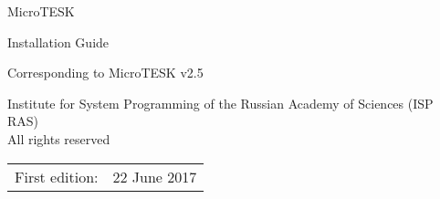 \documentclass[12pt,letterpaper,extrafontsizes]{memoir}
\begin{document}
\firmlists
\midsloppy
\raggedbottom
{}


\frontmatter
\pagestyle{empty}

\vspace*{\fill}
\begin{center}
\HUGE\textsf{MicroTESK}\par
\end{center}

\begin{center}
\Huge\textsf{Installation Guide}\par
\end{center}

\begin{center}
\normalsize\textsf{Corresponding to MicroTESK v2.5}\par
\end{center}

\vspace*{\fill}
\clearpage

\begingroup
\footnotesize
\setlength{\parindent}{0pt}
\setlength{\parskip}{\baselineskip}
\textcopyright{} Institute for System Programming of the Russian Academy of Sciences (ISP RAS)\\
All rights reserved

\begin{center}
\begin{tabular}{ll}
First edition: & 22 June 2017 \\
\end{tabular}
\end{center}

\endgroup
\clearpage

\pagestyle{headings}

\tableofcontents



\mainmatter




\end{document}
